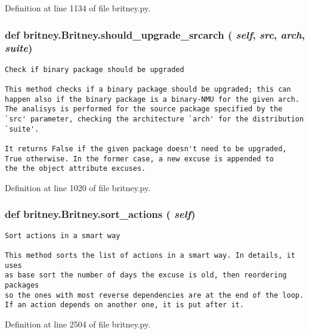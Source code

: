 Definition at line 1134 of file britney.py.
\subsubsection{\setlength{\rightskip}{0pt plus 5cm}def britney.Britney.should\_\-upgrade\_\-srcarch ( {\em self},  {\em src},  {\em arch},  {\em suite})}\label{classbritney_1_1Britney_bd18d7acde434387e94344a39db5b0e5}




\footnotesize\begin{verbatim}Check if binary package should be upgraded

This method checks if a binary package should be upgraded; this can
happen also if the binary package is a binary-NMU for the given arch.
The analisys is performed for the source package specified by the
`src' parameter, checking the architecture `arch' for the distribution
`suite'.
       
It returns False if the given package doesn't need to be upgraded,
True otherwise. In the former case, a new excuse is appended to
the the object attribute excuses.
\end{verbatim}
\normalsize
 

Definition at line 1020 of file britney.py.
\subsubsection{\setlength{\rightskip}{0pt plus 5cm}def britney.Britney.sort\_\-actions ( {\em self})}\label{classbritney_1_1Britney_70115e28e2ee6aa3a09d1efbd81b4a87}




\footnotesize\begin{verbatim}Sort actions in a smart way

This method sorts the list of actions in a smart way. In details, it uses
as base sort the number of days the excuse is old, then reordering packages
so the ones with most reverse dependencies are at the end of the loop.
If an action depends on another one, it is put after it.
\end{verbatim}
\normalsize
 

Definition at line 2504 of file britney.py.
